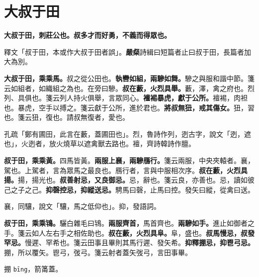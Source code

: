 \section{大叔于田}


\textbf{大叔于田，刺莊公也。叔多才而好勇，不義而得眾也。}

\begin{quoting}釋文「叔于田，本或作大叔于田者誤」。\textbf{嚴粲}詩緝曰短篇者止曰叔于田，長篇者加大為別。\end{quoting}

\textbf{大叔于田，乘乘馬。}{\footnotesize 叔之從公田也。}\textbf{執轡如組，兩驂如舞。}{\footnotesize 驂之與服和諧中節。箋云如組者，如織組之為也。在旁曰驂。}\textbf{叔在藪，火烈具舉。}{\footnotesize 藪，澤，禽之府也。烈列、具俱也。箋云列人持火俱舉，言眾同心。}\textbf{襢裼暴虎，獻于公所。}{\footnotesize 襢裼，肉袒也。暴虎，空手以搏之。箋云獻于公所，進於君也。}\textbf{將叔無狃，戒其傷女。}{\footnotesize 狃，習也。箋云狃，復也。請叔無復者，愛也。}

\begin{quoting}孔疏「鄭有圃田，此言在藪，蓋圃田也」。烈，魯詩作列，迾古字，說文「迾，遮也」，火迾者，放火燒草以遮禽獸去路也。襢，齊詩韓詩作膻。\end{quoting}

\textbf{叔于田，乘乘黃。}{\footnotesize 四馬皆黃。}\textbf{兩服上襄，兩驂鴈行。}{\footnotesize 箋云兩服，中央夾轅者。襄，駕也。上駕者，言為眾馬之最良也。鴈行者，言與中服相次序。}\textbf{叔在藪，火烈具揚。}{\footnotesize 揚，揚光也。}\textbf{叔善射忌，又良御忌。}{\footnotesize 忌，辭也。箋云良，亦善也。忌，讀如彼己之子之己。}\textbf{抑磬控忌，抑縱送忌。}{\footnotesize 騁馬曰磬，止馬曰控。發矢曰縱，從禽曰送。}

\begin{quoting}襄，同驤，說文「驤，馬之低仰也」。抑，發語詞。\end{quoting}

\textbf{叔于田，乘乘鴇。}{\footnotesize 驪白雜毛曰鴇。}\textbf{兩服齊首，}{\footnotesize 馬首齊也。}\textbf{兩驂如手。}{\footnotesize 進止如御者之手。箋云如人左右手之相佐助也。}\textbf{叔在藪，火烈具阜。}{\footnotesize 阜，盛也。}\textbf{叔馬慢忌，叔發罕忌。}{\footnotesize 慢遲、罕希也。箋云田事且畢則其馬行遲、發矢希。}\textbf{抑釋掤忌，抑鬯弓忌。}{\footnotesize 掤，所以覆矢。鬯弓，弢弓。箋云射者蓋矢弢弓，言田事畢。}

\begin{quoting}掤 \texttt{bīng}，箭筩蓋。\end{quoting}

